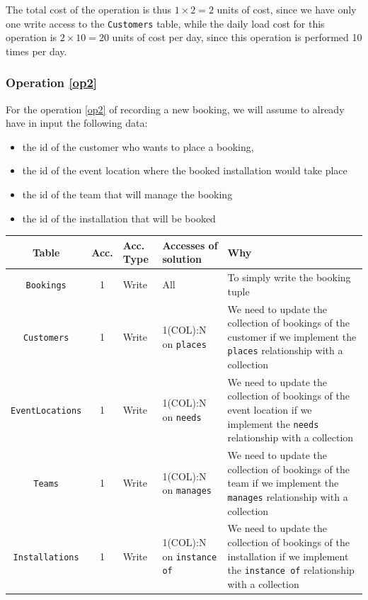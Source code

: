 The total cost of the operation is thus $1 \times 2 = 2$ units of cost, since we have only one write access to the \texttt{Customers} table, while the daily load cost for this operation is $2 \times 10 = 20$ units of cost per day, since this operation is performed 10 times per day.

\subsubsection{Operation \ref{op2}}

For the operation \ref{op2} of recording a new booking, we will assume to already have in input the following data:
\begin{itemize}
    \item the id of the customer who wants to place a booking,
    \item the id of the event location where the booked installation would take place
    \item the id of the team that will manage the booking
    \item the id of the installation that will be booked
\end{itemize}

\begin{longtable}[H]{|c|c|p{1cm}|p{2cm}|p{8cm}|}
    \hline
    \textbf{Table} & \textbf{Acc.} & \textbf{Acc. Type} & \textbf{Accesses of solution} & \textbf{Why} \\
    \hline
    \texttt{Bookings} & 1 & Write & All & To simply write the booking tuple \\
    \hline
    \texttt{Customers} & 1 & Write & 1(COL):N on \texttt{places} & We need to update the collection of bookings of the customer if we implement the \texttt{places} relationship with a collection \\
    \hline
    \texttt{EventLocations} & 1 & Write & 1(COL):N on \texttt{needs} & We need to update the collection of bookings of the event location if we implement the \texttt{needs} relationship with a collection \\
    \hline
    \texttt{Teams} & 1 & Write & 1(COL):N on \texttt{manages} & We need to update the collection of bookings of the team if we implement the \texttt{manages} relationship with a collection \\
    \hline
    \texttt{Installations} & 1 & Write & 1(COL):N on \texttt{instance of} & We need to update the collection of bookings of the installation if we implement the \texttt{instance of} relationship with a collection \\
    \hline
\end{longtable}

